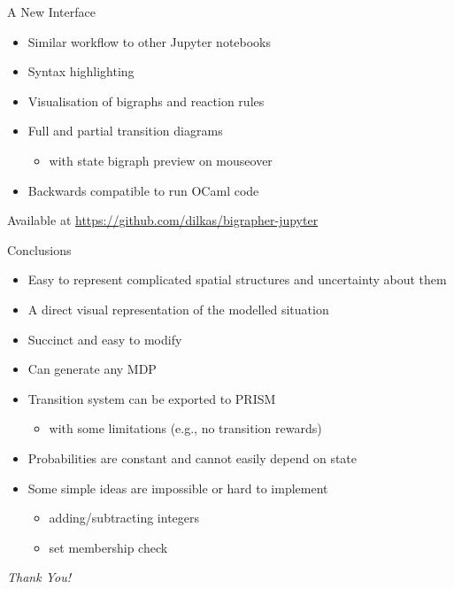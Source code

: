 \documentclass{beamer}
\newcommand\pro{\item[\textcolor{green}{$+$}]}
\newcommand\con{\item[\textcolor{red}{$-$}]}
\begin{document}
\begin{frame}{A New Interface}
  \begin{itemize}
  \item Similar workflow to other Jupyter notebooks
  \item<2-> Syntax highlighting
  \item<3-> Visualisation of bigraphs and reaction rules
  \item<4-> Full and partial transition diagrams
    \begin{itemize}
    \item with state bigraph preview on mouseover
    \end{itemize}
  \item<5-> Backwards compatible to run OCaml code
  \end{itemize}
  \begin{block}{Available at}
    \url{https://github.com/dilkas/bigrapher-jupyter}
  \end{block}
\end{frame}


\begin{frame}{Conclusions}
  \begin{itemize}
    \pro Easy to represent complicated spatial structures and uncertainty about
    them
    \pause
    \pro A direct visual representation of the modelled situation
    \pause
    \pro Succinct and easy to modify
    \pause
    \pro Can generate any MDP
    \pause
    \pro Transition system can be exported to PRISM
    \begin{itemize}
      \con with some limitations (e.g., no transition rewards)
    \end{itemize}
    \pause
    \con Probabilities are constant and cannot easily depend on state
    \pause
    \con Some simple ideas are impossible or hard to implement
    \begin{itemize}
      \pause
    \item adding/subtracting integers
      \pause
    \item set membership check
    \end{itemize}
  \end{itemize}
  \pause
  \centering
  \large
  \emph{Thank You!}
\end{frame}
\end{document}
